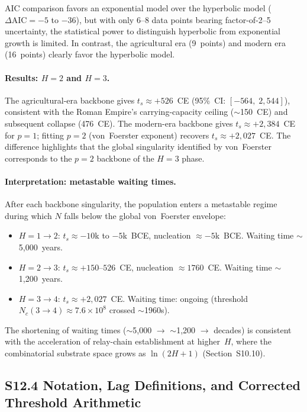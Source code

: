 \documentclass[11pt]{article}
\begin{document}
AIC comparison favors an exponential model over the hyperbolic model ($\Delta\mathrm{AIC} = -5$ to $-36$), but with only 6--8 data points bearing factor-of-2--5 uncertainty, the statistical power to distinguish hyperbolic from exponential growth is limited.  In contrast, the agricultural era (9~points) and modern era (16~points) clearly favor the hyperbolic model.

\paragraph{Results: $H = 2$ and $H = 3$.}
The agricultural-era backbone gives $t_s \approx +526$~CE (95\%~CI: $[-564, \; 2{,}544]$), consistent with the Roman Empire's carrying-capacity ceiling ($\sim$150~CE) and subsequent collapse (476~CE).  The modern-era backbone gives $t_s \approx +2{,}384$~CE for $p = 1$; fitting $p = 2$ (von~Foerster exponent) recovers $t_s \approx +2{,}027$~CE.  The difference highlights that the global singularity identified by von~Foerster~\cite{vonfoerster1960} corresponds to the $p = 2$ backbone of the $H = 3$ phase.

\paragraph{Interpretation: metastable waiting times.}
After each backbone singularity, the population enters a metastable regime during which $N$ falls below the global von~Foerster envelope:
\begin{itemize}
  \item $H = 1 \to 2$: $t_s \approx -10$k to $-5$k~BCE, nucleation $\approx -5$k~BCE.  Waiting time $\sim$5{,}000~years.
  \item $H = 2 \to 3$: $t_s \approx +150$--$526$~CE, nucleation $\approx 1760$~CE.  Waiting time $\sim$1{,}200~years.
  \item $H = 3 \to 4$: $t_s \approx +2{,}027$~CE.  Waiting time: ongoing (threshold $N_c(3 \to 4) \approx 7.6 \times 10^8$ crossed $\sim$1960s).
\end{itemize}
The shortening of waiting times ($\sim$5{,}000 $\to$ $\sim$1{,}200 $\to$ decades) is consistent with the acceleration of relay-chain establishment at higher~$H$, where the combinatorial substrate space grows as $\ln(2H+1)$ (Section~S10.10).

\subsection*{S12.4 Notation, Lag Definitions, and Corrected Threshold Arithmetic}
\end{document}
